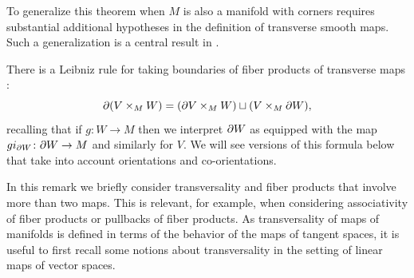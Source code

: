 To generalize this theorem when $M$ is also a manifold with corners requires substantial additional hypotheses in the definition of transverse smooth maps.
Such a generalization is a central result in \cite{Joy12}.

There is a Leibniz rule for taking boundaries of fiber products of transverse maps \cite[Proposition 6.7]{Joy12}:
\begin{equation}\label{E: product boundary}
	\partial(V\times_M W)=(\partial V \times_M W)\sqcup (V\times_M \partial W),
\end{equation}
recalling that if $g \colon W\to M$ then we interpret $\partial W$ as equipped with the map $gi_{\partial W} \colon \partial W\to M$ and similarly for $V$.
We will see versions of this formula below that take into account orientations and co-orientations.

\begin{remark}\label{R: multiproducts}
	In this remark we briefly consider transversality and fiber products that involve more than two maps.
	This is relevant, for example, when considering associativity of fiber products or pullbacks of fiber products.
	As transversality of maps of manifolds is defined in terms of the behavior of the maps of tangent spaces, it is useful to first recall some notions about transversality in the setting of linear maps of vector spaces.


\end{remark}
